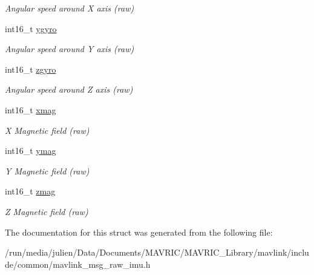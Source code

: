 \begin{DoxyCompactItemize}
\begin{DoxyCompactList}\small\item\em Angular speed around X axis (raw) \end{DoxyCompactList}\item 
\hypertarget{struct____mavlink__raw__imu__t_aff358c8fc1fb40d5862c7367d4bf80e9}{int16\+\_\+t \hyperlink{struct____mavlink__raw__imu__t_aff358c8fc1fb40d5862c7367d4bf80e9}{ygyro}}\label{struct____mavlink__raw__imu__t_aff358c8fc1fb40d5862c7367d4bf80e9}

\begin{DoxyCompactList}\small\item\em Angular speed around Y axis (raw) \end{DoxyCompactList}\item 
\hypertarget{struct____mavlink__raw__imu__t_a42af4ae862faf80bb6754e09db7ca9fe}{int16\+\_\+t \hyperlink{struct____mavlink__raw__imu__t_a42af4ae862faf80bb6754e09db7ca9fe}{zgyro}}\label{struct____mavlink__raw__imu__t_a42af4ae862faf80bb6754e09db7ca9fe}

\begin{DoxyCompactList}\small\item\em Angular speed around Z axis (raw) \end{DoxyCompactList}\item 
\hypertarget{struct____mavlink__raw__imu__t_a4aa7dda8a63c114e2b60e5d9f767b9ba}{int16\+\_\+t \hyperlink{struct____mavlink__raw__imu__t_a4aa7dda8a63c114e2b60e5d9f767b9ba}{xmag}}\label{struct____mavlink__raw__imu__t_a4aa7dda8a63c114e2b60e5d9f767b9ba}

\begin{DoxyCompactList}\small\item\em X Magnetic field (raw) \end{DoxyCompactList}\item 
\hypertarget{struct____mavlink__raw__imu__t_a813c4472362512205eb1035d67f80ff2}{int16\+\_\+t \hyperlink{struct____mavlink__raw__imu__t_a813c4472362512205eb1035d67f80ff2}{ymag}}\label{struct____mavlink__raw__imu__t_a813c4472362512205eb1035d67f80ff2}

\begin{DoxyCompactList}\small\item\em Y Magnetic field (raw) \end{DoxyCompactList}\item 
\hypertarget{struct____mavlink__raw__imu__t_a9c91b2950a80f2598bb7c1ed484cb74a}{int16\+\_\+t \hyperlink{struct____mavlink__raw__imu__t_a9c91b2950a80f2598bb7c1ed484cb74a}{zmag}}\label{struct____mavlink__raw__imu__t_a9c91b2950a80f2598bb7c1ed484cb74a}

\begin{DoxyCompactList}\small\item\em Z Magnetic field (raw) \end{DoxyCompactList}\end{DoxyCompactItemize}


The documentation for this struct was generated from the following file\+:\begin{DoxyCompactItemize}
\item 
/run/media/julien/\+Data/\+Documents/\+M\+A\+V\+R\+I\+C/\+M\+A\+V\+R\+I\+C\+\_\+\+Library/mavlink/include/common/mavlink\+\_\+msg\+\_\+raw\+\_\+imu.\+h\end{DoxyCompactItemize}

